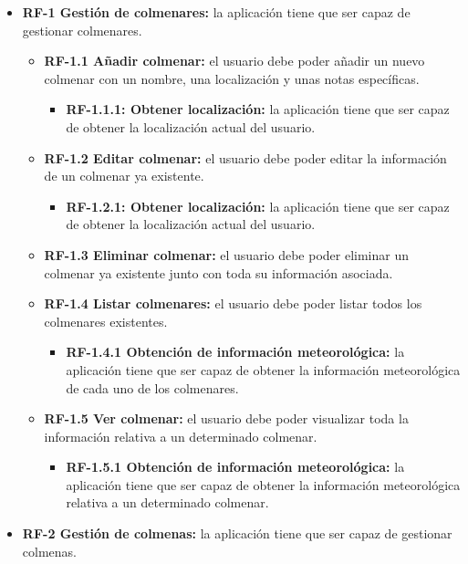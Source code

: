 \begin{itemize}
\tightlist
\item
  \textbf{RF-1 Gestión de colmenares:} la aplicación tiene que ser capaz
  de gestionar colmenares.

  \begin{itemize}
  \tightlist
  \item
    \textbf{RF-1.1 Añadir colmenar:} el usuario debe poder añadir un
    nuevo colmenar con un nombre, una localización y unas notas
    específicas.

    \begin{itemize}
    \tightlist
    \item
      \textbf{RF-1.1.1: Obtener localización:} la aplicación tiene que
      ser capaz de obtener la localización actual del usuario.
    \end{itemize}
  \item
    \textbf{RF-1.2 Editar colmenar:} el usuario debe poder editar la
    información de un colmenar ya existente.

    \begin{itemize}
    \tightlist
    \item
      \textbf{RF-1.2.1: Obtener localización:} la aplicación tiene que
      ser capaz de obtener la localización actual del usuario.
    \end{itemize}
  \item
    \textbf{RF-1.3 Eliminar colmenar:} el usuario debe poder eliminar un
    colmenar ya existente junto con toda su información asociada.
  \item
    \textbf{RF-1.4 Listar colmenares:} el usuario debe poder listar
    todos los colmenares existentes.

    \begin{itemize}
    \tightlist
    \item
      \textbf{RF-1.4.1 Obtención de información meteorológica:} la
      aplicación tiene que ser capaz de obtener la información
      meteorológica de cada uno de los colmenares.
    \end{itemize}
  \item
    \textbf{RF-1.5 Ver colmenar:} el usuario debe poder visualizar toda
    la información relativa a un determinado colmenar.

    \begin{itemize}
    \tightlist
    \item
      \textbf{RF-1.5.1 Obtención de información meteorológica:} la
      aplicación tiene que ser capaz de obtener la información
      meteorológica relativa a un determinado colmenar.
    \end{itemize}
  \end{itemize}
\item
  \textbf{RF-2 Gestión de colmenas:} la aplicación tiene que ser capaz
  de gestionar colmenas.


\end{itemize}
